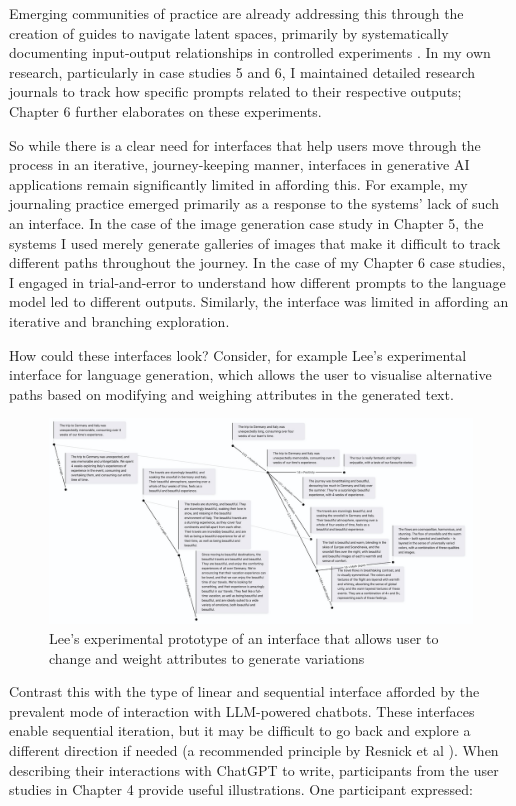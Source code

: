 Emerging communities of practice are already addressing this through the creation of guides to navigate latent spaces, primarily by systematically documenting input-output relationships in controlled experiments \cite{Smith2022-dm}. In my own research, particularly in case studies 5 and 6, I maintained detailed research journals to track how specific prompts related to their respective outputs; Chapter 6 further elaborates on these experiments.

So while there is a clear need for interfaces that help users move through the process in an iterative, journey-keeping manner, interfaces in generative AI applications remain significantly limited in affording this. For example, my journaling practice emerged primarily as a response to the systems' lack of such an interface. In the case of the image generation case study in Chapter 5, the systems I used merely generate galleries of images that make it difficult to track different paths throughout the journey. In the case of my Chapter 6 case studies, I engaged in trial-and-error to understand how different prompts to the language model led to different outputs. Similarly, the interface was limited in affording an iterative and branching exploration.

How could these interfaces look? Consider, for example Lee's experimental interface for language generation, which allows the user to visualise alternative paths based on modifying and weighing attributes in the generated text. 

\begin{figure}[H]
    \centering
    \includegraphics[width=1\linewidth]{linuslee.png}
    \caption{Lee's experimental prototype of an interface that allows user to change and weight attributes to generate variations}
    \label{fig:linusleebranching}
\end{figure}


Contrast this with the type of linear and sequential interface afforded by the prevalent mode of interaction with LLM-powered chatbots. These interfaces enable sequential iteration, but it may be difficult to go back and explore a different direction if needed (a recommended principle by Resnick et al \cite{Resnick2005-fs}).  When describing their interactions with ChatGPT to write, participants from the user studies in Chapter 4 provide useful illustrations. One participant expressed:

